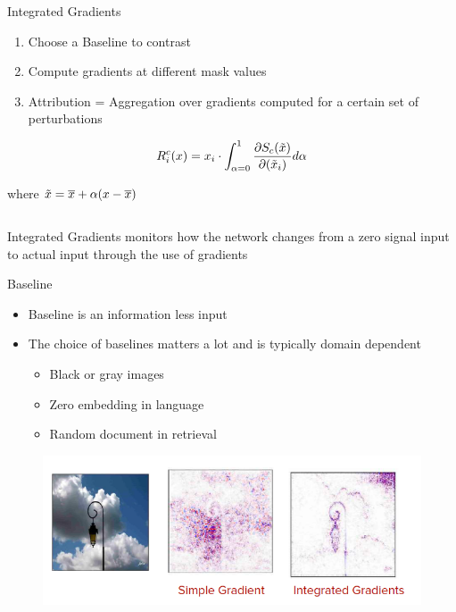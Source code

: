 \documentclass[11pt,compress,t,notes=noshow, aspectratio=169, xcolor=table]{beamer}
\begin{document}
\begin{frame}{Integrated Gradients}
\begin{enumerate}
    \item Choose a Baseline to contrast
    \item Compute gradients at different mask values
    \item Attribution = Aggregation over gradients computed for a certain set of perturbations
\end{enumerate}
\bigskip

\begin{equation*}
   R^c_i(x) = x_i \cdot \int^1_{\alpha = 0} \frac{\partial S_c(\Tilde{x})}{\partial(\Tilde{x}_i)}d\alpha
\end{equation*}

where $\Tilde{x}=\overline{x}+\alpha(x-\overline{x})$


$$
$$

Integrated Gradients monitors how the network changes from a zero signal input to actual
input through the use of gradients
\end{frame}

\begin{frame}{Baseline}
    \begin{itemize}
        \item Baseline is an information less input
        \item The choice of baselines matters a lot and is typically domain dependent
        \begin{itemize}
            \item Black or gray images
            \item Zero embedding in language
            \item Random document in retrieval
        \end{itemize}
    \end{itemize}
    \begin{figure}
        \centering
        \includegraphics[scale=.5]{bild25}
    \end{figure}
\end{frame}
\end{document}
